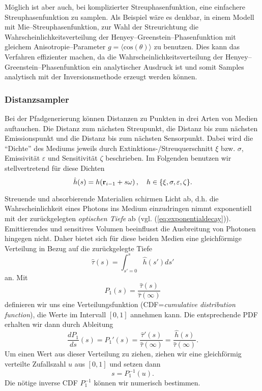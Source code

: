 	Möglich ist aber auch, bei komplizierter Streuphasenfunktion, eine einfachere Streuphasenfunktion zu samplen. Als Beispiel wäre es denkbar, in einem Modell mit Mie--Streuphasenfunktion, zur Wahl der Streurichtung die Wahrscheinlichkeitsverteilung der Henyey--Greenstein--Phasenfunktion \citep[siehe][]{Henyey:1940p15273} mit gleichem Anisotropie--Parameter $g=\langle \text{cos}(\theta)\rangle$ zu benutzen. Dies kann das Verfahren effizienter machen, da die Wahrscheinlichkeitsverteilung der Henyey--Greenstein--Phasenfunktion ein analytischer Ausdruck ist und somit Samples analytisch mit der Inversionsmethode erzeugt werden können.
	
	\subsubsection{Distanzsampler}\label{subsubsec:distancesampler}
	Bei der Pfadgenerierung können Distanzen zu Punkten in drei Arten von Medien auftauchen. Die Distanz zum nächsten Streupunkt, die Distanz bis zum nächsten Emissionspunkt und die Distanz bis zum nächsten Sensorpunkt. Dabei wird die ``Dichte'' des Mediums jeweils durch Extinktions-/Streuquerschnitt $\xi$ bzw. $\sigma$, Emissivität $\varepsilon$ und Sensitivität $\zeta$ beschrieben. Im Folgenden benutzen wir stellvertretend für diese Dichten
	$${\hat h}(s)=h(\mathbf{r}_{i-1}+s\omega)\,,\quad h\in\{\xi,\sigma,\varepsilon,\zeta\}.$$
	
	Streuende und absorbierende Materialien schirmen Licht ab, d.h. die Wahrscheinlichkeit eines Photons ins Medium einzudringen nimmt exponentiell mit der zurückgelegten {\em optischen Tiefe} ab (vgl. (\ref{eq:exponentialdecay})). Emittierendes und sensitives Volumen beeinflusst die Ausbreitung von Photonen hingegen nicht. Daher bietet sich für diese beiden Medien eine gleichförmige Verteilung in Bezug auf die zurückgelegte Tiefe
	$${\hat \tau}(s)=\int_{s'=0}^s {\hat h}(s')ds'$$
	an. Mit
	$$P_1(s)=\frac{{\hat \tau}(s)}{{\hat \tau}(\infty)}$$
	definieren wir uns eine Verteilungsfunktion (CDF={\em cumulative distribution function}), die Werte im Intervall $[0,1]$ annehmen kann. Die entsprechende PDF erhalten wir dann durch Ableitung
	$$\frac{dP_1}{ds}(s)=P_1'(s)=\frac{{\hat \tau}'(s)}{{\hat \tau}(\infty)}=\frac{{\hat h}(s)}{{\hat \tau}(\infty)}.$$
	Um einen Wert aus dieser Verteilung zu ziehen, ziehen wir eine gleichförmig verteilte Zufallszahl $u$ aus $[0,1]$ und setzen dann
	$$s=P_1^{-1}(u).$$
	Die nötige inverse CDF $P_1^{-1}$ können wir numerisch bestimmen.
	

